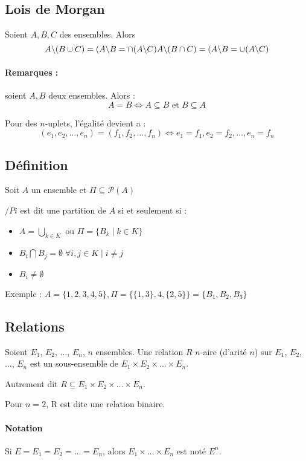 \documentclass[12pt, a4paper]{report}
\begin{document}
\subsection{Lois de Morgan}
Soient $A, B, C$ des ensembles. Alors
\[
A\backslash(B \cup C) = (A\backslash B=\cap(A\backslash C) \\
A\backslash(B \cap C) = (A\backslash B=\cup(A\backslash C)
\]

\paragraph{Remarques :} soient $A, B$ deux ensembles. Alors :
\[
A=B \Leftrightarrow A\subseteq B \text{ et } B\subseteq A
\]

Pour des $n$-uplets, l'égalité devient a :
\[
(e_1,e_2,\dots,e_n)=(f_1,f_2,\dots,f_n)\Leftrightarrow e_1=f_1,e_2=f_2,\dots,e_n=f_n
\]

\subsection{Définition}


Soit $A$ un ensemble et $\Pi \subseteq \mathcal{P}(A)$

$/Pi$ est dit une partition de $A$ si et seulement si :
\begin{itemize}
\item $A = \bigcup_{k\in K} \text{ ou }\Pi=\{B_k \mid k\in K\}$
\item $B_i\bigcap B_j = \emptyset \; \forall i, j\in K \mid i\neq j$
\item $B_i \neq \emptyset$
\end{itemize}

Exemple : $A=\{1,2,3,4,5\}, \Pi=\{\{1,3\},4,\{2,5\}\} = \{B_1,B_2,B_3\}$

\subsection{Relations}

Soient $E_1$, $E_2$, $\dots$, $E_n$, $n$ ensembles. Une relation $R$ $n$-aire (d'arité $n$) sur $E_1$, $E_2$, ..., $E_n$ est un sous-ensemble de $E_1 \times E_2 \times \dots \times E_n$.


Autrement dit $R \subseteq E_1 \times E_2 \times \dots \times E_n$.


Pour $n = 2$, R est dite une relation binaire.

\paragraph{Notation} Si $E = E_1 = E_2 = \dots = E_n$, alors $E_1 \times \dots \times E_n$ est noté $E^{n}$.
\end{document}
